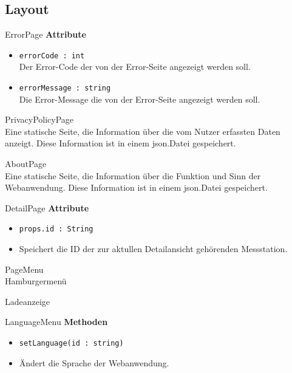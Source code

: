 \subsection{Layout}

    \begin{Class}{ErrorPage}
        \textbf{Attribute}
        \begin{itemize}
            \item \texttt{errorCode : int}
            \\Der Error-Code der von der Error-Seite angezeigt werden soll.
            \item \texttt{errorMessage : string}
            \\Die Error-Message die von der Error-Seite angezeigt werden soll.
        \end{itemize}
    \end{Class}

    \begin{Class}{PrivacyPolicyPage}
       \\Eine statische Seite, die Information über die vom Nutzer erfassten Daten anzeigt. Diese Information ist in einem json.Datei gespeichert.
    \end{Class}

    \begin{Class}{AboutPage}
       \\Eine statische Seite, die Information über die Funktion und Sinn der Webanwendung. Diese Information ist in einem json.Datei gespeichert.
    \end{Class}

    \begin{Class}{DetailPage}
        \textbf{Attribute}
        \begin{itemize}
            \item \texttt{props.id : String}
            \item Speichert die ID der zur aktullen Detailansicht gehörenden Messstation.
        \end{itemize}
    \end{Class}

    \begin{Class}{PageMenu}
            \\Hamburgermenü
    \end{Class}

    \begin{Class}{Ladeanzeige}
    \end{Class}

    \begin{Class}{LanguageMenu}
        \textbf{Methoden}
        \begin{itemize}
            \item \texttt{setLanguage(id : string)}
            \item Ändert die Sprache der Webanwendung.
        \end{itemize}
    \end{Class}

   
